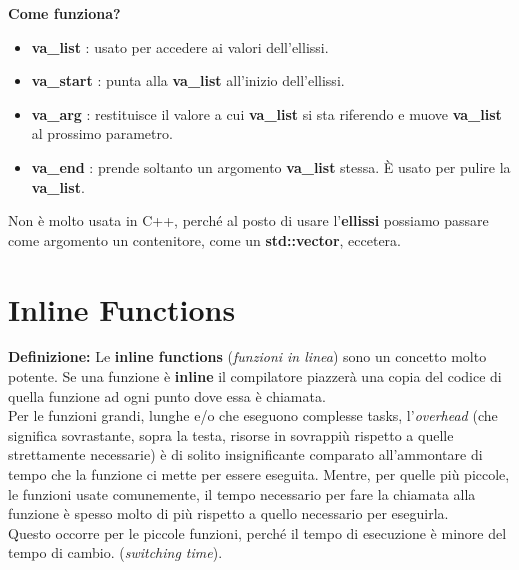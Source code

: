 \textsf{\small \textbf{Come funziona?}} \\

\begin{itemize}
	\item \textsf{\small \textbf{va\_list} : usato per accedere ai valori dell'ellissi.}
	\item \textsf{\small \textbf{va\_start} : punta alla \textbf{va\_list} all'inizio dell'ellissi.}
	\item \textsf{\small \textbf{va\_arg} : restituisce il valore a cui \textbf{va\_list} si sta riferendo e muove \textbf{va\_list} al prossimo parametro.}
	\item \textsf{\small \textbf{va\_end} : prende soltanto un argomento \textbf{va\_list} stessa. È usato per pulire la \textbf{va\_list}.}
\end{itemize}

\textsf{\small Non è molto usata in C++, perché al posto di usare l'\textbf{ellissi} possiamo passare come argomento un contenitore, come un \textbf{std::vector}, eccetera.} \\


\newpage

\section{Inline Functions}

\textsf{\small \textbf{Definizione: } Le \textbf{inline functions} (\emph{funzioni in linea}) sono un concetto molto potente. Se una funzione è \textbf{inline} il compilatore piazzerà una copia del codice di quella funzione ad ogni punto dove essa è chiamata.} \\

\textsf{\small Per le funzioni grandi, lunghe e/o che eseguono complesse tasks,	l'\emph{overhead} (che significa sovrastante, sopra la testa, risorse in sovrappiù rispetto a quelle strettamente necessarie) è di solito insignificante comparato all'ammontare di tempo che la funzione ci mette per essere eseguita. Mentre, per quelle più piccole, le funzioni usate comunemente, il tempo necessario per fare la chiamata alla funzione è spesso molto di più rispetto a quello necessario per eseguirla.} \\

\textsf{\small Questo occorre per le piccole funzioni, perché il tempo di esecuzione è minore del tempo di cambio. (\emph{switching time}).} \break

